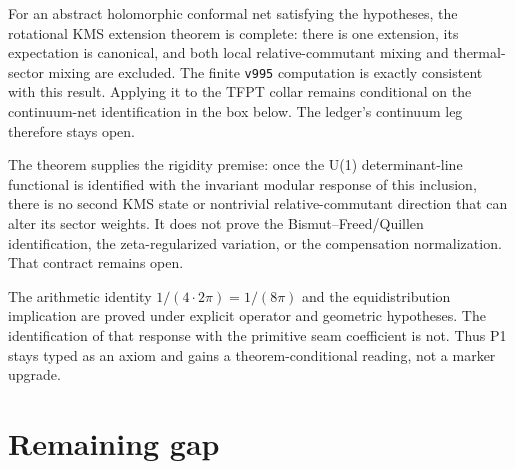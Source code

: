\documentclass[11pt]{article}
\theoremstyle{remark}
\begin{document}
\begin{description}[style=nextline]
\item[\texttt{SEAM.STATE.RPMIXING.01}, continuum leg.]
For an abstract holomorphic conformal net satisfying the hypotheses,
the rotational KMS extension theorem is complete: there is one
extension, its expectation is canonical, and both local
relative-commutant mixing and thermal-sector mixing are excluded.
The finite \texttt{v995} computation is exactly consistent with this
result.  Applying it to the TFPT collar remains conditional on the
continuum-net identification in the box below.  The ledger's
continuum leg therefore stays open.

\item[\texttt{ALPHA.QUILLEN.EXACT.01}.]
The theorem supplies the rigidity premise: once the U(1)
determinant-line functional is identified with the invariant modular
response of this inclusion, there is no second KMS state or
nontrivial relative-commutant direction that can alter its sector
weights.  It does not prove the Bismut--Freed/Quillen identification,
the zeta-regularized variation, or the compensation normalization.
That contract remains open.

\item[\texttt{AX.P1.01}.]
The arithmetic identity
$1/(4\cdot2\pi)=1/(8\pi)$ and the equidistribution implication are
proved under explicit operator and geometric hypotheses.
The identification of that response with the primitive seam
coefficient is not.  Thus P1 stays typed as an axiom and gains a
theorem-conditional reading, not a marker upgrade.
\end{description}

\section{Remaining gap}
\end{document}
